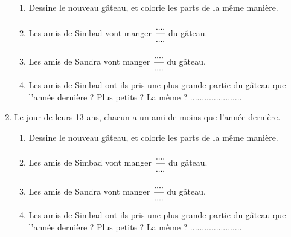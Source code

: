 \documentclass[a4paper,11pt]{article}
\begin{document}
\begin{enumerate}
	      \begin{enumerate}
		      \item Dessine le nouveau gâteau, et colorie les parts de la même manière.
		      \item Les amis de Simbad vont manger $\cfrac{....}{....}$ du gâteau. \vspace{0.5em}
		      \item Les amis de Sandra vont manger $\cfrac{....}{....}$ du gâteau. \vspace{0.5em}
		      \item Les amis de Simbad ont-ils pris une plus grande partie du gâteau que l'année dernière ? Plus petite ? La même ? ......................
	      \end{enumerate}
	\item Le jour de leurs 13 ans, chacun a un ami de moins que l'année dernière.
	      \begin{enumerate}
		      \item Dessine le nouveau gâteau, et colorie les parts de la même manière.
		      \item Les amis de Simbad vont manger $\cfrac{....}{....}$ du gâteau. \vspace{0.5em}
		      \item Les amis de Sandra vont manger $\cfrac{....}{....}$ du gâteau. \vspace{0.5em}
		      \item Les amis de Simbad ont-ils pris une plus grande partie du gâteau que l'année dernière ? Plus petite ? La même ? ......................
	      \end{enumerate}
\end{enumerate}
\end{document}
